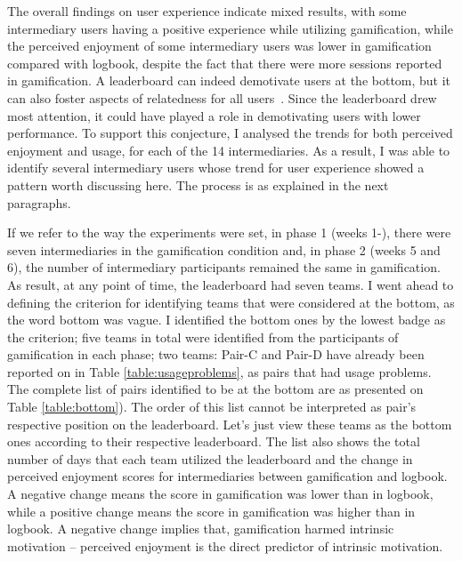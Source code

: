The overall findings on user experience indicate mixed results, with some intermediary users having a positive experience while utilizing gamification, while the perceived enjoyment of some intermediary users was lower in gamification compared with logbook, despite the fact that there were more sessions reported in gamification. A leaderboard can indeed demotivate users at the bottom, but it can also foster aspects of relatedness for all users~\citep{sailer2013:psychological}. Since the leaderboard drew most attention, it could have played a role in demotivating users with lower performance. To support this conjecture, I analysed the trends for both perceived enjoyment and usage, for each of the 14 intermediaries. As a result, I was able to identify several intermediary users whose trend for user experience showed a pattern worth discussing here. The process is as explained in the next paragraphs.

If we refer to the way the experiments were set, in phase 1 (weeks 1\thinspace-), there were seven intermediaries in the gamification condition and, in phase 2 (weeks 5 and 6), the number of intermediary participants remained the same in gamification. As result, at any point of time, the leaderboard had seven teams. I went ahead to defining the criterion for identifying teams that were considered at the bottom, as the word bottom was vague. I identified the bottom ones by the lowest badge as the criterion; five teams in total were identified from the participants of gamification in each phase; two teams: Pair-C and Pair-D have already been reported on in Table \ref{table:usageproblems}, as pairs that had usage problems. The complete list of pairs identified to be at the bottom are as presented on Table \ref{table:bottom}). The order of this list cannot be interpreted as pair's respective position on the leaderboard. Let's just view these teams as the bottom ones according to their respective leaderboard. The list also shows the total number of days that each team utilized the leaderboard and the change in perceived enjoyment scores for intermediaries between gamification and logbook. A negative change means the score in gamification was lower than in logbook, while a positive change means the score in gamification was higher than in logbook. A negative change implies that, gamification harmed intrinsic motivation -- perceived enjoyment is the direct predictor of intrinsic motivation. 

